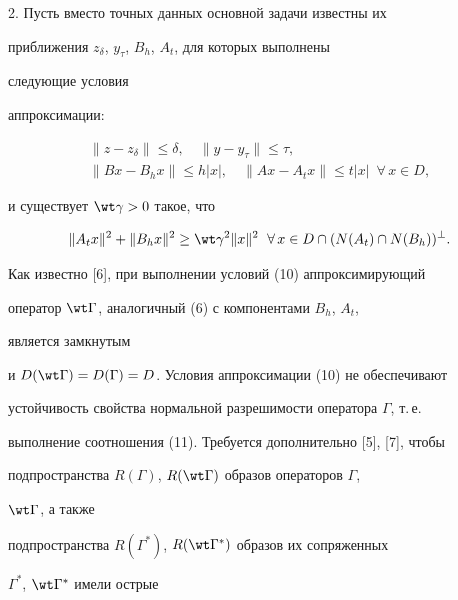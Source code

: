  


2. Пусть вместо точных данных основной задачи известны их  


приближения $z_\delta$, $y_\tau$, $B_h$, $A_t$, для которых выполнены 


следующие условия  


аппроксимации: 


\begin{equation} 


\begin{array}{c}


\|z-z_\delta\|\le\delta,\quad \|y-y_\tau\|\le\tau,\\[2mm] 


\|B x-B_h x\|\le h|x|,\quad 


\|Ax-A_t x\|\le t|x|\ \; \forall\,x\in D, 


\end{array} 


\end{equation} 


и существует $\wt\gamma>0$ такое, что 


\begin{equation} 


\|A_t x\|^2+\|B_h x\|^2\ge\wt\gamma^2\|x\|^2\ \; 


\forall\,x\in D\cap(N(A_t)\cap N(B_h))^\bot. 


\end{equation} 


 


Как известно [6], при выполнении условий (10) аппроксимирующий  


оператор $\wt\Gamma$, аналогичный (6) с компонентами $B_h$, $A_t$, 


является замкнутым  


и $D(\wt\Gamma)=D(\Gamma)=D$. Условия аппроксимации (10) не обеспечивают  


устойчивость свойства нормальной разрешимости оператора $\Gamma$, т.\,е. 


выполнение соотношения (11). Требуется дополнительно [5], [7], чтобы 


подпространства $R(\Gamma)$, $R(\wt\Gamma)$ образов операторов $\Gamma$, 


$\wt\Gamma$, а также  


подпространства $R(\Gamma^*)$, $R(\wt\Gamma^*)$ образов их сопряженных 


$\Gamma^*$, $\wt\Gamma^*$ имели острые  


